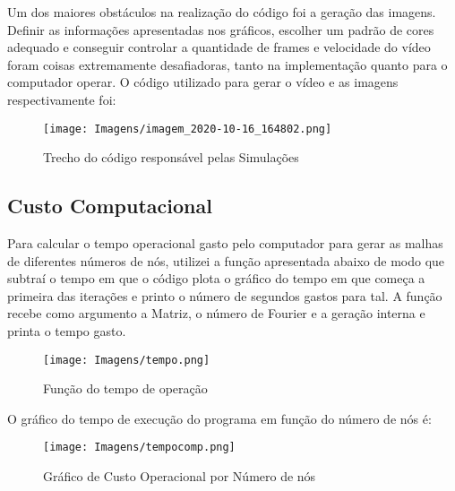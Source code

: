 \documentclass[article]{abntex2}
\begin{document}
Um dos maiores obstáculos na realização do código foi a geração das imagens. Definir as informações apresentadas nos gráficos, escolher um padrão de cores adequado e conseguir controlar a quantidade de frames e velocidade do vídeo foram coisas extremamente desafiadoras, tanto na implementação quanto para o computador operar. O código utilizado para gerar o vídeo e as imagens respectivamente foi:

\begin{figure}[H]
    \begin{center}
       
        \texttt{[image: Imagens/imagem\_2020-10-16\_164802.png]} 
        \caption{Trecho do código responsável pelas Simulações}
    \end{center}
\end{figure}



\subsection{Custo Computacional}



Para calcular o tempo operacional gasto pelo computador para gerar as malhas de diferentes números de nós, utilizei a função apresentada abaixo de modo que subtraí o tempo em que o código plota o gráfico do tempo em que começa a primeira das iterações e printo o número de segundos gastos para tal. A função recebe como argumento a Matriz, o número de Fourier e a geração interna e printa o tempo gasto.

\begin{figure}[H]
    \begin{center}
                \texttt{[image: Imagens/tempo.png]} 
        \caption{Função do tempo de operação}
    \end{center}
\end{figure}

O gráfico do tempo de execução do programa em função do número de nós é:



\begin{figure}[H]
    \begin{center}
        
        \texttt{[image: Imagens/tempocomp.png]} 
        \caption{Gráfico de Custo Operacional por Número de nós}
    \end{center}
\end{figure}
\end{document}
